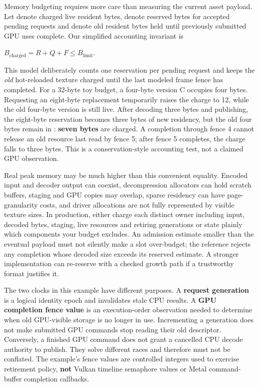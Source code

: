 Memory budgeting requires more care than measuring the current asset payload. Let  denote charged live resident bytes,  denote reserved bytes for accepted pending requests and  denote old resident bytes held until previously submitted GPU uses complete. Our simplified accounting invariant is

\(B_{\mathrm{charged}} = R+Q+F \le B_{\mathrm{limit}}.\)

This model deliberately counts one reservation per pending request and keeps the \emph{old} hot-reloaded texture charged until the last modeled frame fence has completed. For a 32-byte toy budget, a four-byte version C occupies four bytes. Requesting an eight-byte replacement temporarily raises the charge to 12, while the old four-byte version is still live. After decoding three bytes and publishing, the eight-byte reservation becomes three bytes of new residency, but the old four bytes remain in : \textbf{seven bytes} are charged. A completion through fence 4 cannot release an old resource last read by fence 5; after fence 5 completes, the charge falls to three bytes. This is a conservation-style accounting test, not a claimed GPU observation.

Real peak memory may be much higher than this convenient equality. Encoded input and decoder output can coexist, decompression allocators can hold scratch buffers, staging and GPU copies may overlap, sparse residency can have page-granularity costs, and driver allocations are not fully represented by visible texture sizes. In production, either charge each distinct owner including input, decoded bytes, staging, live resources and retiring generations or state plainly which components your budget excludes. An admission estimate smaller than the eventual payload must not silently make a slot over-budget; the reference rejects any completion whose decoded size exceeds its reserved estimate. A stronger implementation can re-reserve with a checked growth path if a trustworthy format justifies it.

The two clocks in this example have different purposes. A \textbf{request generation} is a logical identity epoch and invalidates stale CPU results. A \textbf{GPU completion fence value} is an execution-order observation needed to determine when old GPU-visible storage is no longer in use. Incrementing a generation does not make submitted GPU commands stop reading their old descriptor. Conversely, a finished GPU command does not grant a cancelled CPU decode authority to publish. They solve different races and therefore must not be conflated. The example's fence values are controlled integers used to exercise retirement policy, \textbf{not} Vulkan timeline semaphore values or Metal command-buffer completion callbacks.

